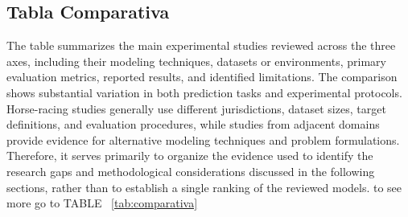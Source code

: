 \subsection{Tabla Comparativa}
\label{sec:tabla_comparativa}

The table summarizes the main experimental studies reviewed
across the three axes, including their modeling techniques, datasets or
environments, primary evaluation metrics, reported results, and identified
limitations. The comparison shows substantial variation in both prediction
tasks and experimental protocols. Horse-racing studies generally use
different jurisdictions, dataset sizes, target definitions, and evaluation
procedures, while studies from adjacent domains provide evidence for
alternative modeling techniques and problem formulations. Therefore, it
serves primarily to organize the evidence used to identify the research gaps
and methodological considerations discussed in the following sections, rather
than to establish a single ranking of the reviewed models. to see more go to
TABLE ~\ref{tab:comparativa}

